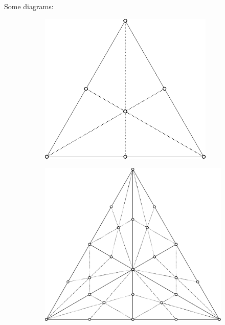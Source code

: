 Some diagrams:
\begin{figure}[H]
  \centering
  \begin{subfigure}{.45\linewidth}
    \includegraphics[width=\linewidth]{figures/barycentric-1.pdf}
  \end{subfigure}
  \hspace{1cm}
  \begin{subfigure}{.45\linewidth}
    \includegraphics[width=\linewidth]{figures/barycentric-2.pdf}

\end{subfigure}
\end{figure}
